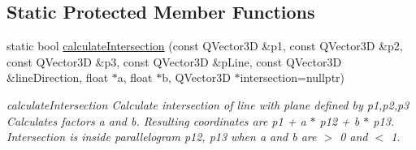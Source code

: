 \subsection*{Static Protected Member Functions}
\begin{DoxyCompactItemize}
\item 
static bool \mbox{\hyperlink{class_g_l_body_a4a0a876d516652e66c2269c18d4032bc}{calculate\+Intersection}} (const Q\+Vector3D \&p1, const Q\+Vector3D \&p2, const Q\+Vector3D \&p3, const Q\+Vector3D \&p\+Line, const Q\+Vector3D \&line\+Direction, float $\ast$a, float $\ast$b, Q\+Vector3D $\ast$intersection=nullptr)
\begin{DoxyCompactList}\small\item\em calculate\+Intersection Calculate intersection of line with plane defined by p1,p2,p3 Calculates factors a and b. Resulting coordinates are p1 + a $\ast$ p12 + b $\ast$ p13. Intersection is inside parallelogram p12, p13 when a and b are $>$ 0 and $<$ 1. \end{DoxyCompactList}\end{DoxyCompactItemize}

